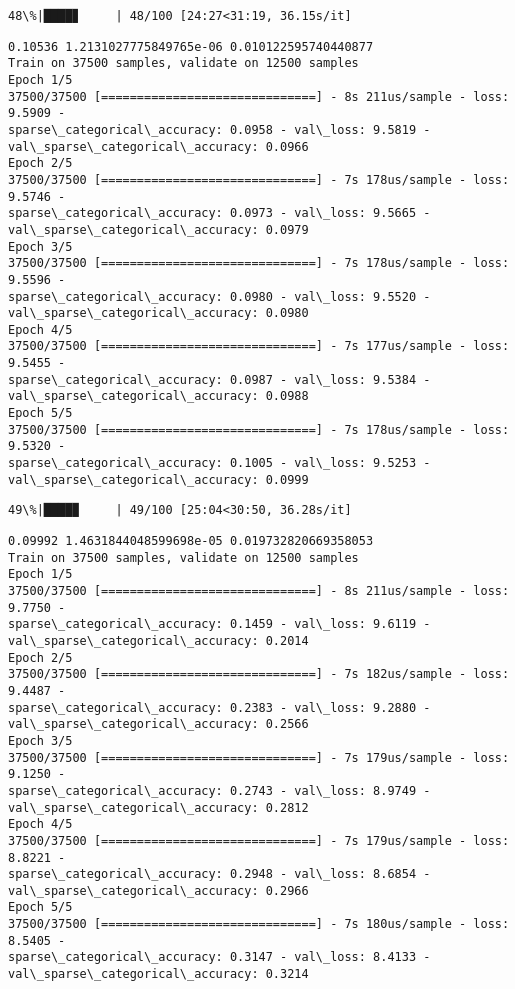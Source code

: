 \documentclass[11pt]{article}
\begin{document}
    \begin{Verbatim}[commandchars=\\\{\}]
 48\%|████▊     | 48/100 [24:27<31:19, 36.15s/it]
    \end{Verbatim}

    \begin{Verbatim}[commandchars=\\\{\}]
0.10536 1.2131027775849765e-06 0.010122595740440877
Train on 37500 samples, validate on 12500 samples
Epoch 1/5
37500/37500 [==============================] - 8s 211us/sample - loss: 9.5909 -
sparse\_categorical\_accuracy: 0.0958 - val\_loss: 9.5819 -
val\_sparse\_categorical\_accuracy: 0.0966
Epoch 2/5
37500/37500 [==============================] - 7s 178us/sample - loss: 9.5746 -
sparse\_categorical\_accuracy: 0.0973 - val\_loss: 9.5665 -
val\_sparse\_categorical\_accuracy: 0.0979
Epoch 3/5
37500/37500 [==============================] - 7s 178us/sample - loss: 9.5596 -
sparse\_categorical\_accuracy: 0.0980 - val\_loss: 9.5520 -
val\_sparse\_categorical\_accuracy: 0.0980
Epoch 4/5
37500/37500 [==============================] - 7s 177us/sample - loss: 9.5455 -
sparse\_categorical\_accuracy: 0.0987 - val\_loss: 9.5384 -
val\_sparse\_categorical\_accuracy: 0.0988
Epoch 5/5
37500/37500 [==============================] - 7s 178us/sample - loss: 9.5320 -
sparse\_categorical\_accuracy: 0.1005 - val\_loss: 9.5253 -
val\_sparse\_categorical\_accuracy: 0.0999
    \end{Verbatim}

    \begin{Verbatim}[commandchars=\\\{\}]
 49\%|████▉     | 49/100 [25:04<30:50, 36.28s/it]
    \end{Verbatim}

    \begin{Verbatim}[commandchars=\\\{\}]
0.09992 1.4631844048599698e-05 0.019732820669358053
Train on 37500 samples, validate on 12500 samples
Epoch 1/5
37500/37500 [==============================] - 8s 211us/sample - loss: 9.7750 -
sparse\_categorical\_accuracy: 0.1459 - val\_loss: 9.6119 -
val\_sparse\_categorical\_accuracy: 0.2014
Epoch 2/5
37500/37500 [==============================] - 7s 182us/sample - loss: 9.4487 -
sparse\_categorical\_accuracy: 0.2383 - val\_loss: 9.2880 -
val\_sparse\_categorical\_accuracy: 0.2566
Epoch 3/5
37500/37500 [==============================] - 7s 179us/sample - loss: 9.1250 -
sparse\_categorical\_accuracy: 0.2743 - val\_loss: 8.9749 -
val\_sparse\_categorical\_accuracy: 0.2812
Epoch 4/5
37500/37500 [==============================] - 7s 179us/sample - loss: 8.8221 -
sparse\_categorical\_accuracy: 0.2948 - val\_loss: 8.6854 -
val\_sparse\_categorical\_accuracy: 0.2966
Epoch 5/5
37500/37500 [==============================] - 7s 180us/sample - loss: 8.5405 -
sparse\_categorical\_accuracy: 0.3147 - val\_loss: 8.4133 -
val\_sparse\_categorical\_accuracy: 0.3214
    \end{Verbatim}
\end{document}
